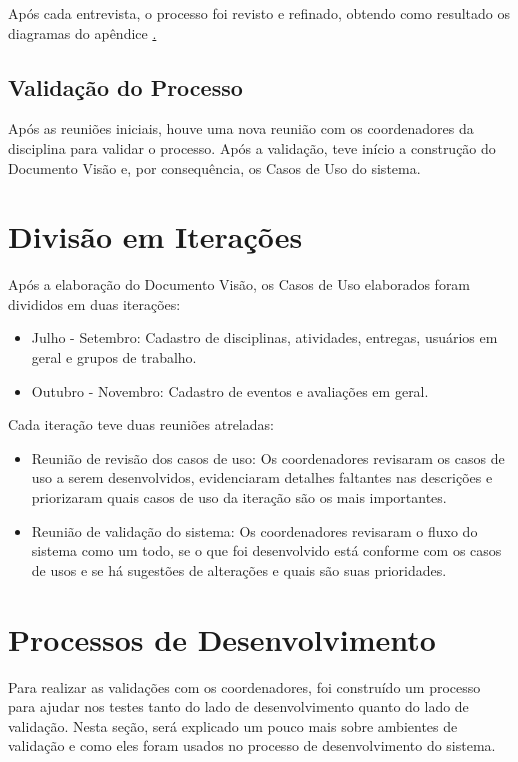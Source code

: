 Após cada entrevista, o processo foi revisto e refinado, obtendo como resultado os diagramas do apêndice \href{chap:bpmn-appendix}.

\subsection{Validação do Processo}
Após as reuniões iniciais, houve uma nova reunião com os coordenadores da disciplina para validar o processo. Após a validação, teve início a construção do Documento Visão e, por consequência, os Casos de Uso do sistema.

\section{Divisão em Iterações}
Após a elaboração do Documento Visão, os Casos de Uso elaborados foram divididos em duas iterações:

\begin{itemize}
    \item Julho - Setembro: Cadastro de disciplinas, atividades, entregas, usuários em geral e grupos de trabalho.
    \item Outubro - Novembro: Cadastro de eventos e avaliações em geral.
\end{itemize}

Cada iteração teve duas reuniões atreladas:
\begin{itemize}
    \item Reunião de revisão dos casos de uso: Os coordenadores revisaram os casos de uso a serem desenvolvidos, evidenciaram detalhes faltantes nas descrições e priorizaram quais casos de uso da iteração são os mais importantes.
    \item Reunião de validação do sistema: Os coordenadores revisaram o fluxo do sistema como um todo, se o que foi desenvolvido está conforme com os casos de usos e se há sugestões de alterações e quais são suas prioridades.
\end{itemize}

\section{Processos de Desenvolvimento}
Para realizar as validações com os coordenadores, foi construído um processo para ajudar nos testes tanto do lado de desenvolvimento quanto do lado de validação. Nesta seção, será explicado um pouco mais sobre ambientes de validação e como eles foram usados no processo de desenvolvimento do sistema.

